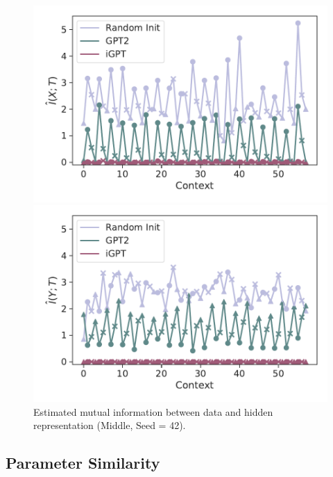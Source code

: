 \documentclass{article}
\begin{document}
\begin{figure}[H]
    \centering
    \begin{minipage}[b]{0.45\linewidth}
    \includegraphics[width=\linewidth]{figs/mi_x_6.mlp.dropout_40_gpt2_igpt_dt_hopper_medium_42.pdf}
    \end{minipage}
    \begin{minipage}[b]{0.45\linewidth}
    \includegraphics[width=\linewidth]{figs/mi_y_6.mlp.dropout_40_gpt2_igpt_dt_hopper_medium_42.pdf}
    \end{minipage}
    \caption{Estimated mutual information between data and hidden representation (Middle, Seed = 42).}
    \label{fig:mutual_information_context_middle_42}
\end{figure}


\subsection{Parameter Similarity}
\label{appendix:results-for-other-conditions-parameter-similarity}
\end{document}

